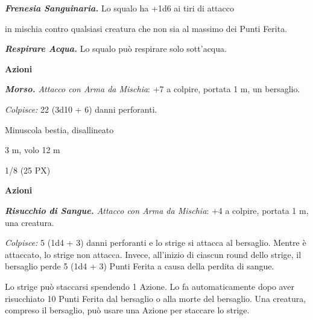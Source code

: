 \begin{multicols}{2}
{\emph{\textbf{Frenesia Sanguinaria.}} Lo squalo ha +1d6 ai tiri di attacco

in mischia contro qualsiasi creatura che non sia al massimo dei Punti Ferita.

\emph{\textbf{Respirare Acqua.}} Lo squalo può respirare solo sott'acqua.

\textbf{Azioni}

\emph{\textbf{Morso.} Attacco con Arma da Mischia}: +7 a colpire, portata 1 m, un bersaglio.

\emph{Colpisce:} 22 (3d10 + 6) danni perforanti.

\begin{description}[noitemsep, topsep=0pt, parsep=0pt, partopsep=0pt, itemsep=1pt, leftmargin=2.35cm,  labelwidth=2.2cm, itemindent=0cm, listparindent=0pt] %
\setlength{\baselineskip}{10pt}
\item[\textbf{Taglia/Tipo}] Minuscola bestia, disallineato
\item[\textbf{Caratt.}] 
\item[\textbf{Punti Ferita}] 
\item[\textbf{Tiri Salvez.}] 
\item[\textbf{Movimento}] 3 m, volo 12 m
\item[\textbf{Sfida}] 1/8 (25 PX)
\end{description}
\smallskip

\textbf{Azioni}

\emph{\textbf{Risucchio di Sangue.} Attacco con Arma da Mischia}: +4 a colpire, portata 1 m, una creatura.

\emph{Colpisce:} 5 (1d4 + 3) danni perforanti e lo strige si attacca al bersaglio. Mentre è attaccato, lo strige non attacca. Invece, all'inizio di ciascun round dello strige, il bersaglio perde 5 (1d4 + 3) Punti Ferita a causa della perdita di sangue.

Lo strige può staccarsi spendendo 1 Azione. Lo fa automaticamente dopo aver risucchiato 10 Punti Ferita dal bersaglio o alla morte del bersaglio. Una creatura, compreso il bersaglio, può usare una Azione per staccare lo strige.

}
\end{multicols}
